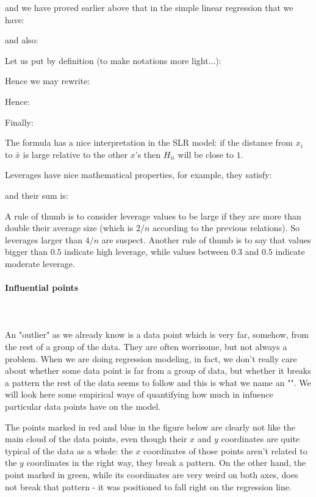 	and we have proved earlier above that in the simple linear regression that we have:
	
	and also:
	
	Let us put by definition (to make notations more light...):
	
	Hence we may rewrite:
	
	Hence:
	
	Finally:
	
	The formula has a nice interpretation in the SLR model: if the distance from $x_i$ to $\bar{x}$ is large relative to the other $x$'s then $H_{ii}$ will be close to $1$.

	Leverages have nice mathematical properties, for example, they satisfy:
	
	and their sum is:
	
	A rule of thumb is to consider leverage values to be large if they are more than double their average size (which is $2/n$ according to the previous relations). So leverages larger than $4/n$ are suspect. Another rule of thumb is to say that values bigger than $0.5$ indicate high leverage, while values between $0.3$ and $0.5$ indicate moderate leverage.
	
	\paragraph{Influential points}\mbox{}\\\\
	An "outlier" as we already know is a data point which is very far, somehow, from the rest of a group of the data. They are often worrisome, but not always a problem. When we are doing regression modeling, in fact, we don't really care about whether some data point is far from a group of data, but whether it breaks a pattern the rest of
the data seems to follow and this is what we name an "". We will look here some empirical ways of quantifying how much in infuence particular data points have on the model. 

	The points marked in red and blue in the figure below are clearly not like the main cloud of the data points, even though their $x$ and $y$ coordinates are quite typical of the data as a whole: the $x$ coordinates of those points aren't related to the $y$ coordinates in the right way, they break a pattern. On the other hand, the point marked in green, while its coordinates are very weird on both axes, does not break that pattern - it was positioned to fall right on the regression line.
	
